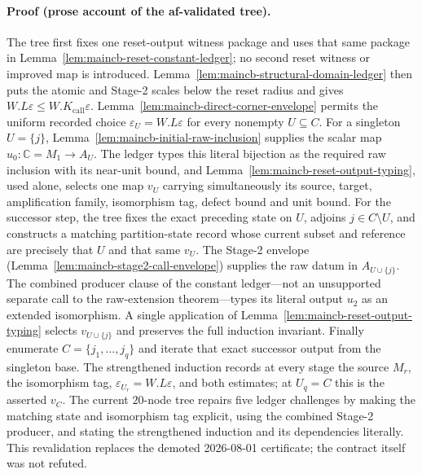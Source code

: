 \paragraph{Proof (prose account of the af-validated tree).}
The tree first fixes one reset-output witness package and uses that same package in
Lemma~\ref{lem:maincb-reset-constant-ledger}; no second reset witness or improved map is
introduced.  Lemma~\ref{lem:maincb-structural-domain-ledger} then puts the atomic and
Stage-2 scales below the reset radius and gives $W.L\varepsilon\le W.K_{\mathrm{call}}
\varepsilon$.  Lemma~\ref{lem:maincb-direct-corner-envelope} permits the uniform recorded
choice $\varepsilon_U=W.L\varepsilon$ for every nonempty $U\subseteq C$.
For a singleton $U=\{j\}$, Lemma~\ref{lem:maincb-initial-raw-inclusion} supplies the scalar
map $u_0:\mathbb C=M_1\to A_U$.  The ledger types this literal bijection as the required raw
inclusion with its near-unit bound, and Lemma~\ref{lem:maincb-reset-output-typing}, used
alone, selects one map $v_U$ carrying simultaneously its source, target, amplification
family, isomorphism tag, defect bound and unit bound.
For the successor step, the tree fixes the exact preceding state on $U$, adjoins
$j\in C\setminus U$, and constructs a matching partition-state record whose current
subset and reference are precisely that $U$ and that same $v_U$.  The Stage-2 envelope
(Lemma~\ref{lem:maincb-stage2-call-envelope}) supplies the raw datum in $A_{U\cup\{j\}}$.
The combined producer clause of the constant ledger---not an unsupported separate call to
the raw-extension theorem---types its literal output $u_2$ as an extended isomorphism.
A single application of Lemma~\ref{lem:maincb-reset-output-typing} selects $v_{U\cup\{j\}}$
and preserves the full induction invariant.
Finally enumerate $C=\{j_1,\ldots,j_q\}$ and iterate that exact successor output from the
singleton base.  The strengthened induction records at every stage the source $M_r$, the
isomorphism tag, $\varepsilon_{U_r}=W.L\varepsilon$, and both estimates; at $U_q=C$ this is
the asserted $v_C$.  The current $20$-node tree repairs five ledger challenges by making
the matching state and isomorphism tag explicit, using the combined Stage-2 producer, and
stating the strengthened induction and its dependencies literally.  This revalidation
replaces the demoted 2026-08-01 certificate; the contract itself was not refuted.
